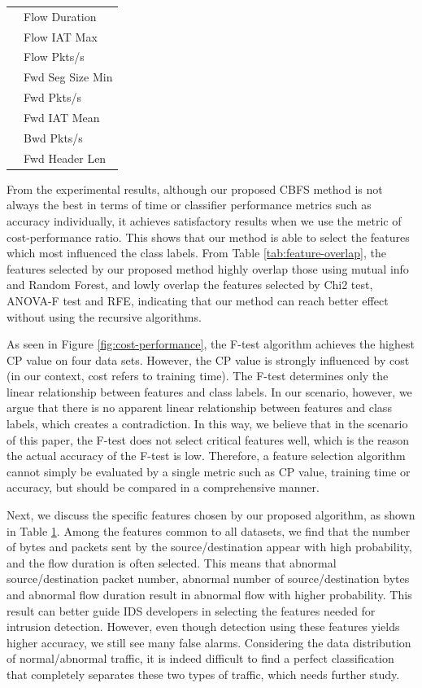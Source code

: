 \documentclass{ieeeaccess}
\theoremstyle{definition}
\begin{document}
\begin{table}[htbp]
\begin{tabular}{ll}
            & Flow Duration \\
            & Flow IAT Max \\
            & Flow Pkts/s \\
            & Fwd Seg Size Min \\
            & Fwd Pkts/s \\
            & Fwd IAT Mean \\
            & Bwd Pkts/s \\
            & Fwd Header Len \\
        \bottomrule
        \end{tabular}%
    \label{tab:selected-features}%
\end{table}%

From the experimental results, although our proposed CBFS method is not always the best in terms of time or classifier performance metrics such as accuracy individually, it achieves satisfactory results when we use the metric of cost-performance ratio. This shows that our method is able to select the features which most influenced the class labels. From Table \ref{tab:feature-overlap}, the features selected by our proposed method highly overlap those using mutual info and Random Forest, and lowly overlap the features selected by Chi2 test, ANOVA-F test and RFE, indicating that our method can reach better effect without using the recursive algorithms.

As seen in Figure \ref{fig:cost-performance}, the F-test algorithm achieves the highest CP value on four data sets. However, the CP value is strongly influenced by cost (in our context, cost refers to training time). The F-test determines only the linear relationship between features and class labels. In our scenario, however, we argue that there is no apparent linear relationship between features and class labels, which creates a contradiction. In this way, we believe that in the scenario of this paper, the F-test does not select critical features well, which is the reason the actual accuracy of the F-test is low. Therefore, a feature selection algorithm cannot simply be evaluated by a single metric such as CP value, training time or accuracy, but should be compared in a comprehensive manner.

Next, we discuss the specific features chosen by our proposed algorithm, as shown in Table \ref{tab:selected-features}. Among the features common to all datasets, we find that the number of bytes and packets sent by the source/destination appear with high probability, and the flow duration is often selected. This means that abnormal source/destination packet number, abnormal number of source/destination bytes and abnormal flow duration result in abnormal flow with higher probability. This result can better guide IDS developers in selecting the features needed for intrusion detection. However, even though detection using these features yields higher accuracy, we still see many false alarms. Considering the data distribution of normal/abnormal traffic, it is indeed difficult to find a perfect classification that completely separates these two types of traffic, which needs further study.
\end{document}
